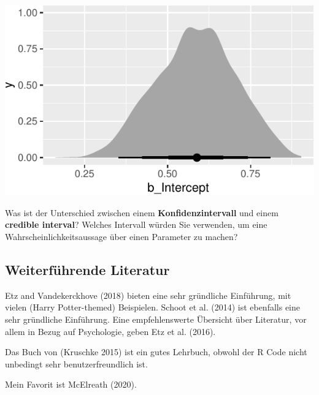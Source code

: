 \documentclass[]{tufte-handout}
\begin{document}
\includegraphics{01-intro-bayesian-stats_files/figure-latex/unnamed-chunk-37-1}

Was ist der Unterschied zwischen einem \textbf{Konfidenzintervall} und
einem \textbf{credible interval}? Welches Intervall würden Sie
verwenden, um eine Wahrscheinlichkeitsaussage über einen Parameter zu
machen?

\hypertarget{weiterfuxfchrende-literatur}{%
\subsection{Weiterführende
Literatur}\label{weiterfuxfchrende-literatur}}

Etz and Vandekerckhove (2018) bieten eine sehr gründliche Einführung,
mit vielen (Harry Potter-themed) Beispielen. Schoot et al. (2014) ist
ebenfalls eine sehr gründliche Einführung. Eine empfehlenswerte
Übersicht über Literatur, vor allem in Bezug auf Psychologie, geben Etz
et al. (2016).

Das Buch von (Kruschke 2015) ist ein gutes Lehrbuch, obwohl der R Code
nicht unbedingt sehr benutzerfreundlich ist.

Mein Favorit ist McElreath (2020).
\end{document}
